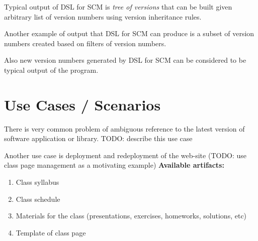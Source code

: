 \documentclass[11pt]{article}
\begin{document}

Typical output of DSL for SCM is \textit{tree of versions} that can be built given arbitrary list of version numbers using version inheritance rules. 

Another example of output that DSL for SCM can produce is a subset of version numbers created based on filters of version numbers.

Also new version numbers generated by DSL for SCM can be considered to be typical output of the program.



\section{Use Cases / Scenarios}
\label{sec:examples}


There is very common problem of ambiguous reference to the latest version of software application or library. TODO: describe this use case

Another use case is deployment and redeployment of the web-site (TODO: use class page management as a motivating example)
\textbf{Available artifacts:}
\begin{enumerate}
\item Class syllabus
\item Class schedule 
\item Materials for the class (presentations, exercises, homeworks, solutions, etc)
\item Template of class page
\end{enumerate}
\end{document}
